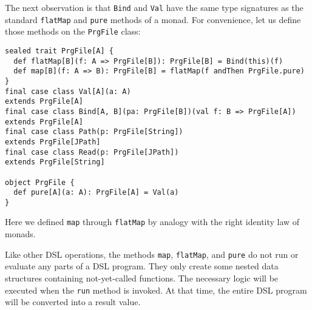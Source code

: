 The next observation is that \lstinline!Bind!
and \lstinline!Val! have
the same type signatures as the standard \lstinline!flatMap!
and \lstinline!pure! methods
of a monad. For convenience, let us define those methods on the \lstinline!PrgFile!
class:
\begin{lstlisting}
sealed trait PrgFile[A] {
  def flatMap[B](f: A => PrgFile[B]): PrgFile[B] = Bind(this)(f)
  def map[B](f: A => B): PrgFile[B] = flatMap(f andThen PrgFile.pure)
}
final case class Val[A](a: A)                                       extends PrgFile[A]
final case class Bind[A, B](pa: PrgFile[B])(val f: B => PrgFile[A]) extends PrgFile[A]
final case class Path(p: PrgFile[String])                           extends PrgFile[JPath]
final case class Read(p: PrgFile[JPath])                            extends PrgFile[String]

object PrgFile {
  def pure[A](a: A): PrgFile[A] = Val(a) 
}
\end{lstlisting}
Here we defined \lstinline!map!
through \lstinline!flatMap!
by analogy with the right identity law of monads.

Like other DSL operations, the methods \lstinline!map!,
\lstinline!flatMap!, and
\lstinline!pure! do not
run or evaluate any parts of a DSL program. They only create some
nested data structures containing not-yet-called functions. The necessary
logic will be executed when the \lstinline!run!
method is invoked. At that time, the entire DSL program will be converted
into a result value.

